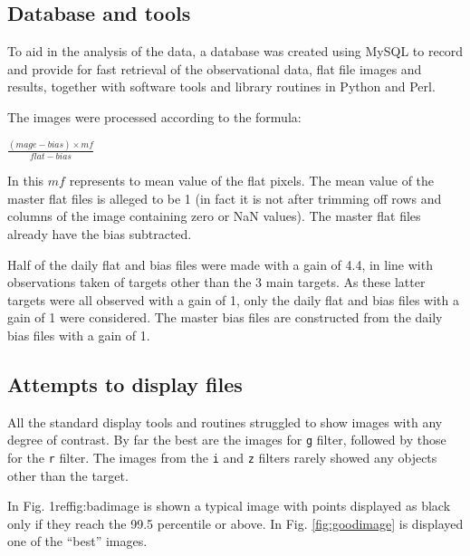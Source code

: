 \subsection{Database and tools}
\protect\label{section:database}

To aid in the analysis of the data, a database was created using MySQL to
record and provide for fast retrieval of the observational data, flat file
images and results, together with software tools and library routines in Python
and Perl.

The images were processed according to the formula:

\begin{center}
$ \frac{(mage - bias) \times mf}{flat - bias}$
\end{center}

In this $mf$ represents to mean value of the flat pixels. The mean value of the
master flat files is alleged to be 1 (in fact it is not after trimming off rows
and columns of the image containing zero or NaN values). The master flat files
already have the bias subtracted.

Half of the daily flat and bias files were made with a gain of 4.4, in line with
observations taken of targets other than the 3 main {\rdwarf} targets. As these
latter targets were all observed with a gain of 1, only the daily flat and bias
files with a gain of 1 were considered. The master bias files are
constructed from the daily bias files with a gain of 1.

\subsection{Attempts to display files}

All the standard display tools and routines struggled to show images with any
degree of contrast. By far the best are the images for \texttt{g} filter,
followed by those for the \texttt{r} filter. The images from the \texttt{i} and
\texttt{z} filters rarely showed any objects other than the target.

In Fig. 1ref{fig:badimage} is shown a typical image with points displayed as
black only if they reach the 99.5 percentile or above. In Fig.
\ref{fig:goodimage} is displayed one of the ``best'' images.

